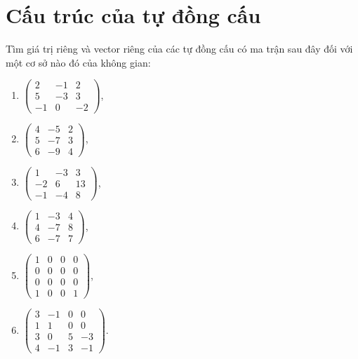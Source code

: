 \documentclass[class=linearalgebra,crop=false]{standalone}
\begin{document}
\chapter{Cấu trúc của tự đồng cấu}

\begin{exercise}
    \par Tìm giá trị riêng và vector riêng của các tự đồng cấu có ma trận sau đây đối với một cơ sở nào đó của không gian:
    \begin{enumerate}[label = (\alph*)]
        \item $
                  \begin{pmatrix}
                      2  & -1 & 2  \\
                      5  & -3 & 3  \\
                      -1 & 0  & -2
                  \end{pmatrix}
              $,
        \item $
                  \begin{pmatrix}
                      4 & -5 & 2 \\
                      5 & -7 & 3 \\
                      6 & -9 & 4
                  \end{pmatrix}
              $,
        \item $
                  \begin{pmatrix}
                      1  & -3 & 3  \\
                      -2 & 6  & 13 \\
                      -1 & -4 & 8
                  \end{pmatrix}
              $,
        \item $
                  \begin{pmatrix}
                      1 & -3 & 4 \\
                      4 & -7 & 8 \\
                      6 & -7 & 7
                  \end{pmatrix}
              $,
        \item $
                  \begin{pmatrix}
                      1 & 0 & 0 & 0 \\
                      0 & 0 & 0 & 0 \\
                      0 & 0 & 0 & 0 \\
                      1 & 0 & 0 & 1
                  \end{pmatrix}
              $,
        \item $
                  \begin{pmatrix}
                      3 & -1 & 0 & 0  \\
                      1 & 1  & 0 & 0  \\
                      3 & 0  & 5 & -3 \\
                      4 & -1 & 3 & -1
                  \end{pmatrix}
              $.
    \end{enumerate}
\end{exercise}
\end{document}
